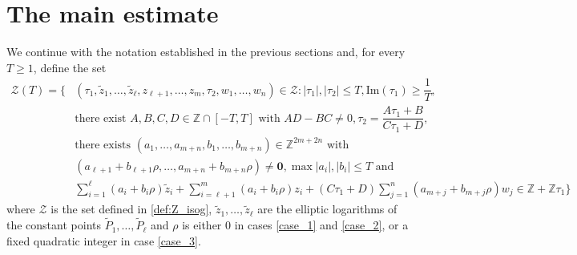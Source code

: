 \documentclass[11pt,a4paper,reqno]{amsart}
\numberwithin{equation}{section}
\newcommand{\Z}{\mathbb{Z}}
\renewcommand{\r}{\rho}
\newcommand{\pt}[1]{\left( #1 \right)}
\newcommand{\pq}[1]{\left[ #1 \right]}
\newcommand{\abs}[1]{\left| #1 \right|}
\renewcommand{\Im}{\mathrm{Im}}
\theoremstyle{remark}
\theoremstyle{definition}
\theoremstyle{definition}
\begin{document}
\section{The main estimate}
We continue with the notation established in the previous sections and, for every $T\geq 1$, define the set
\begin{align*}
\mathcal{Z}(T)=\Bigg\lbrace&\pt{\tau_1,\widetilde{z}_1,\ldots,\widetilde{z}_{\ell}, z_{\ell+1}, \ldots, z_m, \tau_2, w_1, \ldots, w_n} \in \mathcal{Z}: \lvert \tau_1\rvert, \lvert \tau_2 \rvert\leq T, \Im(\tau_1)\geq \dfrac{1}{T},\\
& \text{there exist } A,B,C,D \in \Z \cap \pq{-T,T} \text{ with } AD-BC\neq 0, \tau_2=\dfrac{A\tau_1+B}{C\tau_1+D},\\
& \text{there exists } \pt{a_{1},\ldots, a_{m+n}, b_{1}, \ldots, b_{m+n}} \in \Z^{2m+2n} \text{ with }\\ &\pt{a_{\ell+1}+b_{\ell+1} \r, \ldots, a_{m+n}+ b_{m+n} \r}\neq \mathbf{0}, \max \abs{a_i}, \abs{b_i} \leq T \text{ and }\\
& \sum\limits_{i=1}^{\ell}\!(a_i+b_i \r) \widetilde{z}_i + \sum\limits_{i=\ell+1}^{m}\!(a_i+b_i \r) z_i+(C\tau_1+D)\sum\limits_{j=1}^{n}(a_{m+j}+b_{m+j}\r)w_j \in \Z+ \Z\tau_1 \Bigg\rbrace
\end{align*}
where $\mathcal{Z}$ is the set defined in \eqref{def:Z_isog}, $\widetilde{z}_1,\ldots,\widetilde{z}_{\ell}$ are the elliptic logarithms of the constant points $\widetilde{P}_1, \ldots, \widetilde{P}_{\ell}$ and $\r$ is either $0$ in cases \ref{case_1} and \ref{case_2}, or a fixed quadratic integer in case \ref{case_3}.
\end{document}
